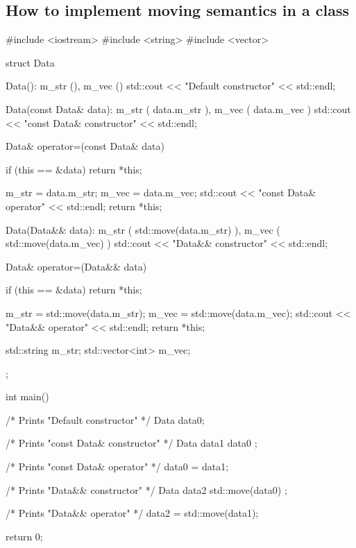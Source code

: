 \documentclass[../main]{subfiles}
\begin{document}
\subsection{How to implement moving semantics in a class}
\begin{Code}
    #include <iostream>
    #include <string>
    #include <vector>
    
    struct Data
    {
        Data():
            m_str (),
            m_vec ()
        {
            std::cout << "Default constructor" << std::endl;
        }
    
        Data(const Data& data):
            m_str ( data.m_str ),
            m_vec ( data.m_vec )
        {
            std::cout << "const Data& constructor" << std::endl;
        }
    
        Data& operator=(const Data& data)
        {
            if (this == &data)
            {
                return *this;
            }
    
            m_str = data.m_str;
            m_vec = data.m_vec;
            std::cout << "const Data& operator" << std::endl;
            return *this;
        }
    
        Data(Data&& data):
            m_str ( std::move(data.m_str) ),
            m_vec ( std::move(data.m_vec) )
        {
            std::cout << "Data&& constructor" << std::endl;
        }
    
        Data& operator=(Data&& data)
        {
            if (this == &data)
            {
                return *this;
            }
    
            m_str = std::move(data.m_str);
            m_vec = std::move(data.m_vec);
            std::cout << "Data&& operator" << std::endl;
            return *this;
        }
    
        std::string m_str;
        std::vector<int> m_vec;
    };
    
    int main()
    {
        /* Prints "Default constructor" */
        Data data0;
        
        /* Prints "const Data& constructor" */
        Data data1 { data0 };
        
        /* Prints "const Data& operator" */
        data0 = data1;
    
        /* Prints "Data&& constructor" */
        Data data2 { std::move(data0) };
        
        /* Prints "Data&& operator" */
        data2 = std::move(data1);
    
        return 0;
    }
\end{Code}
\end{document}
